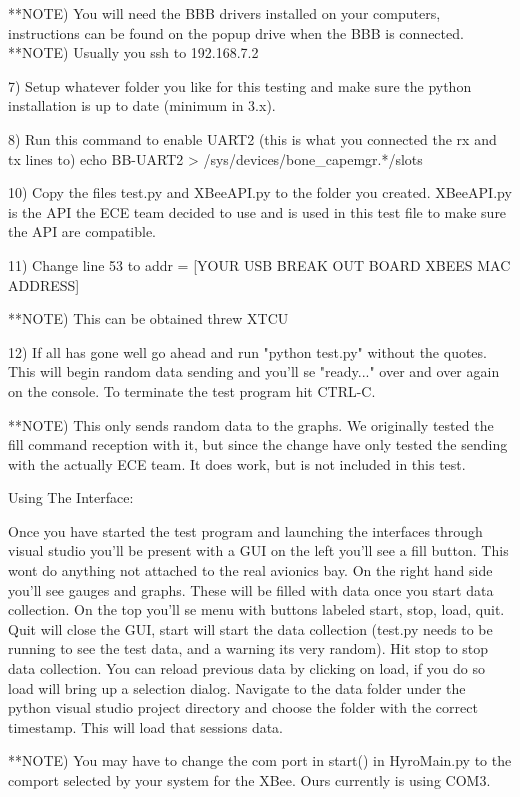 \documentclass[10pt,draftclsnofoot,onecolumn,retainorgcmds]{IEEEtran}
\begin{document}
**NOTE) You will need the BBB drivers installed on your computers, instructions can be found on the popup drive when the BBB is connected.
**NOTE) Usually you ssh to 192.168.7.2

7) Setup whatever folder you like for this testing and make sure the python installation is up to date (minimum in 3.x).

8) Run this command to enable UART2 (this is what you connected the rx and tx lines to) 
echo BB-UART2 > /sys/devices/bone\_capemgr.*/slots

10) Copy the files test.py and XBeeAPI.py to the folder you created. XBeeAPI.py is the API the ECE team decided to use and is used in this test file to make
sure the API are compatible. 

11) Change line 53 to addr = [YOUR USB BREAK OUT BOARD XBEES MAC ADDRESS]

**NOTE) This can be obtained threw XTCU

12) If all has gone well go ahead and run "python test.py" without the quotes. This will begin random data sending and you'll se "ready..." over and over again on the
console. To terminate the test program hit CTRL-C.

**NOTE) This only sends random data to the graphs. We originally tested the fill command reception with it, but since the change have only tested the sending with the actually ECE
team. It does work, but is not included in this test. 

Using The Interface:


Once you have started the test program and launching the interfaces through visual  studio you'll be present with a GUI on the left you'll see a fill button. This wont do anything
not attached to the real avionics bay. On the right hand side you'll see gauges and graphs. These will be filled with data once you start data collection. On the top you'll se menu
with buttons labeled start, stop, load, quit. Quit will close the GUI, start will start the data collection (test.py needs to be running to see the test data, and a warning its very
random). Hit stop to stop data collection. You can reload previous data by clicking on load, if you do so load will bring up a selection dialog. Navigate to the data folder under
the python visual studio project directory and choose the folder with the correct timestamp. This will load that sessions data. 

**NOTE) You may have to change the com port in start() in HyroMain.py to the comport selected by your system for the XBee. Ours currently is using COM3.
\end{document}
